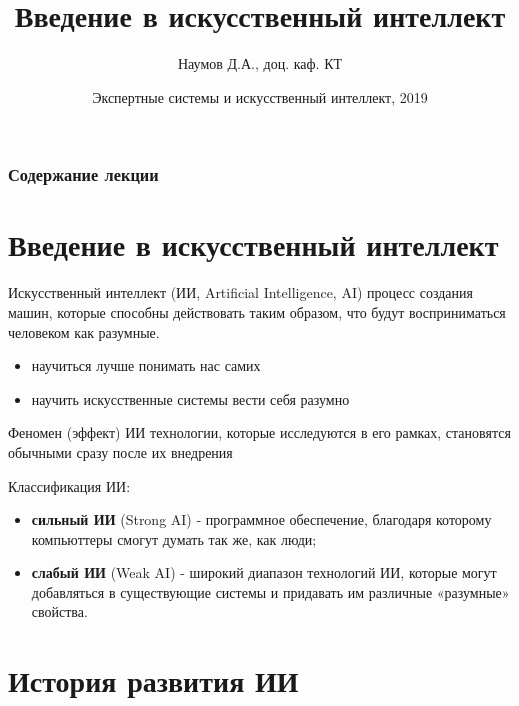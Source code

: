 \documentclass{beamer}
\title[Artifical Intelligence]{Введение в искусственный интеллект}
\author{Наумов Д.А., доц. каф. КТ}
\date[11.02.2019] {Экспертные системы и искусственный интеллект, 2019}
\begin{document}
\begin{frame}
  \titlepage
\end{frame}
  
\begin{frame}
  \frametitle{Содержание лекции}
  \tableofcontents  
\end{frame}

\section{Введение в искусственный интеллект}
  
\begin{frame}[t]
\begin{block}{Искусственный интеллект (ИИ, Artificial Intelligence, AI)}
процесс создания машин, которые способны действовать таким образом, что будут восприниматься человеком как разумные.
\end{block}
\begin{itemize}
\item научиться лучше понимать нас самих
\item научить искусственные системы вести себя разумно
\end{itemize}
\begin{block}{Феномен (эффект) ИИ}
технологии, которые исследуются в его рамках, становятся обычными сразу после их внедрения
\end{block}
Классификация ИИ:
\begin{itemize}
\item \textbf{сильный ИИ} (Strong AI) - программное обеспечение, благодаря которому компьюттеры смогут думать так же, как люди;
\item \textbf{слабый ИИ} (Weak AI) - широкий диапазон технологий ИИ, которые могут добавляться в существующие системы и придавать им различные «разумные» свойства. 
\end{itemize}
\end{frame}

\section{История развития ИИ}
  
\end{document}
